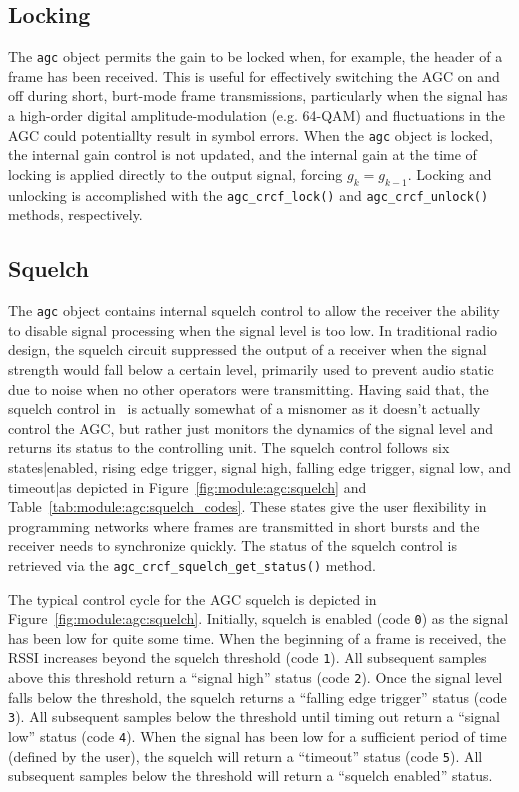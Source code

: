\subsection{Locking}
\label{module:agc:locking}
The {\tt agc} object permits the gain to be locked when, for example,
the header of a frame has been received.
This is useful for effectively switching the AGC on and off during short,
burt-mode frame transmissions, particularly when the signal has a high-order
digital amplitude-modulation (e.g. 64-QAM) and fluctuations in the AGC
could potentiallty result in symbol errors.
%
When the {\tt agc} object is locked, the internal gain control is not
updated,
and the internal gain at the time of locking is applied directly to the
output signal, forcing $g_k = g_{k-1}$.
%
Locking and unlocking is accomplished with the
{\tt agc\_crcf\_lock()} and
{\tt agc\_crcf\_unlock()} methods, respectively.

\subsection{Squelch}
\label{module:agc:squelch}
The {\tt agc} object contains internal squelch control to allow the
receiver the ability to disable signal processing when the signal
level is too low.
In traditional radio design, the squelch circuit suppressed the output
of a receiver when the signal strength would fall below a certain level,
primarily used to prevent audio static due to noise when no other
operators were transmitting.
Having said that, the squelch control in \liquid\ is actually somewhat
of a misnomer as it doesn't actually control the AGC, but rather just
monitors the dynamics of the signal level and returns its status to the
controlling unit.
The squelch control follows six states|enabled, rising edge trigger,
signal high, falling edge trigger, signal low, and timeout|as depicted
in Figure~\ref{fig:module:agc:squelch} and
Table~\ref{tab:module:agc:squelch_codes}.
These states give the user flexibility in programming networks where
frames are transmitted in short bursts and the receiver needs to
synchronize quickly.
The status of the squelch control is retrieved via the
{\tt agc\_crcf\_squelch\_get\_status()} method.

The typical control cycle for the AGC squelch is depicted in
Figure~\ref{fig:module:agc:squelch}.
Initially, squelch is enabled (code {\tt 0}) as the signal has been low for
quite some time.
When the beginning of a frame is received, the RSSI increases beyond the
squelch threshold (code {\tt 1}).
All subsequent samples above this threshold return a ``signal high'' status
(code {\tt 2}).
Once the signal level falls below the threshold, the squelch returns a
``falling edge trigger'' status (code {\tt 3}).
All subsequent samples below the threshold until timing out return a ``signal
low'' status (code {\tt 4}).
When the signal has been low for a sufficient period of time (defined by the
user), the squelch will return a ``timeout'' status (code {\tt 5}).
All subsequent samples below the threshold will return a ``squelch enabled''
status.

